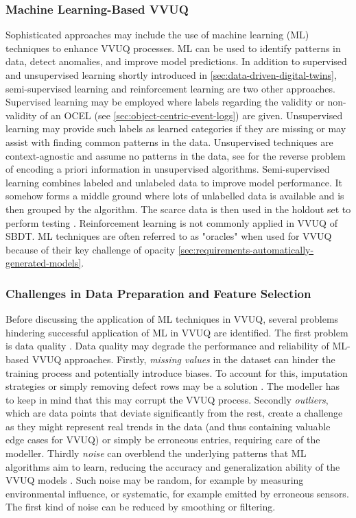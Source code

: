 \subsubsection*{Machine Learning-Based VVUQ}

Sophisticated approaches may include the use of machine learning (ML) techniques to enhance VVUQ processes. ML can be used to identify patterns in data, detect anomalies, and improve model predictions. In addition to supervised and unsupervised learning shortly introduced in \autoref{sec:data-driven-digital-twins}, semi-supervised learning and reinforcement learning are two other approaches. Supervised learning may be employed where labels regarding the validity or non-validity of an OCEL (see \autoref{sec:object-centric-event-logs}) are given. Unsupervised learning may provide such labels as learned categories if they are missing or may assist with finding common patterns in the data. Unsupervised techniques are context-agnostic and assume no patterns in the data, see \citeauthor{hastie2009unsupervised} for the reverse problem of encoding a priori information in unsupervised algorithms. Semi-supervised learning combines labeled and unlabeled data to improve model performance. It somehow forms a middle ground where lots of unlabelled data is available and is then grouped by the algorithm. The scarce data is then used in the holdout set to perform testing \parencite{learning2006semi}. Reinforcement learning is not commonly applied in VVUQ of SBDT.
ML techniques are often referred to as "oracles" when used for VVUQ because of their key challenge of opacity \autoref{sec:requirements-automatically-generated-models}.

\subsubsection*{Challenges in Data Preparation and Feature Selection}

Before discussing the application of ML techniques in VVUQ, several problems hindering successful application of ML in VVUQ are identified. The first problem is data quality \parencite{wu2025uncertainty}. Data quality may degrade the performance and reliability of ML-based VVUQ approaches. Firstly, \textit{missing values} in the dataset can hinder the training process and potentially introduce biases. To account for this, imputation strategies or simply removing defect rows may be a solution \parencite{gudivada2017data}. The modeller has to keep in mind that this may corrupt the VVUQ process. Secondly \textit{outliers}, which are data points that deviate significantly from the rest, create a challenge as they might represent real trends in the data (and thus containing valuable edge cases for VVUQ) or simply be erroneous entries, requiring care of the modeller. Thirdly \textit{noise} can overblend the underlying patterns that ML algorithms aim to learn, reducing the accuracy and generalization ability of the VVUQ models \parencite{liu2020noise}. Such noise may be random, for example by measuring environmental influence, or systematic, for example emitted by erroneous sensors. The first kind of noise can be reduced by smoothing or filtering.


